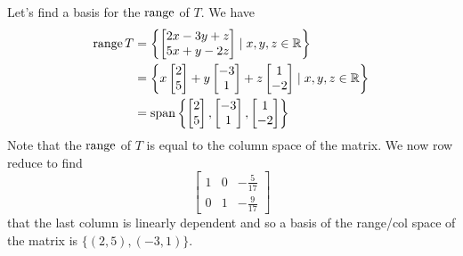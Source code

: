 \documentclass{article}
\DeclareMathOperator{\spn}{span}
\begin{document}
\begin{example}
  Let's find a basis for the $\operatorname{\text{range}}$ of $T$. We have
  \begin{align*}
    \range T &= \left\{
      \begin{bmatrix}
        2x - 3y + z\\
        5x + y - 2z\\
    \end{bmatrix} \mid x, y, z \in \R \right\}\\
    &= \left\{ x
      \begin{bmatrix}
        2\\5\\
      \end{bmatrix} + y
      \begin{bmatrix}
        -3\\1\\
      \end{bmatrix} + z
      \begin{bmatrix}
        1\\-2\\
    \end{bmatrix} \mid x, y, z \in \R \right\}\\
    &= \spn \left\{
      \begin{bmatrix}
        2\\5\\
      \end{bmatrix},
      \begin{bmatrix}
        -3\\1\\
      \end{bmatrix},
      \begin{bmatrix}
        1\\-2\\
    \end{bmatrix}\right\}
  \end{align*}
  Note that the $\operatorname{\text{range}}$ of $T$ is equal to the column space of the matrix. We now row reduce to find \[
    \begin{bmatrix}
      1 & 0 & -\frac{5}{17}\\
      0 & 1 & -\frac{9}{17}
    \end{bmatrix}
  \]
  that the last column is linearly dependent and so a basis of the range/col space of the matrix is $\{(2, 5), (-3, 1)\}$.
\end{example}
\end{document}

